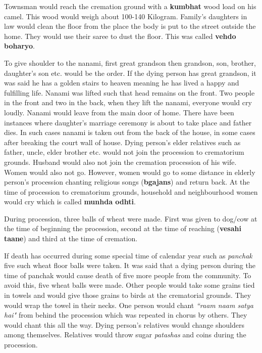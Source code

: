 Townsman would reach the cremation ground with a \textbf{kumbhat} wood load on
his camel. This wood would weigh about 100-140 Kilogram. Family's daughters in
law would clean the floor from the place the body is put to the street outside
the home. They would use their saree to dust the floor. This was called
\textbf{vehdo boharyo}.

To give shoulder to the nanami, first great grandson then grandson, son,
brother, daughter's son etc. would be the order. If the dying person has great
grandson, it was said he has a golden stairs to heaven meaning he has lived a
happy and fulfilling life. Nanami was lifted such that head remains on the
front. Two people in the front and two in the back, when they lift the nanami,
everyone would cry loudly. Nanami would leave from the main door of home. There
have been instances where daughter's marriage ceremony is about to take place
and father dies. In such cases nanami is taken out from the back of the house,
in some cases after breaking the court wall of house. Dying person's elder
relatives such as father, uncle, elder brother etc. would not join the
procession to crematorium grounds. Husband would also not join the cremation
procession of his wife. Women would also not go. However, women would go to
some distance in elderly person's procession chanting religious songs
(\textbf{bgajans}) and return back. At the time of procession to crematorium
grounds, household and neighbourhood women would cry which is called
\textbf{munhda odhti}. 

During procession, three balls of wheat were made. First was given to dog/cow
at the time of beginning the procession, second at the time of reaching
(\textbf{vesahi taane}) and third at the time of cremation.

If death has occurred during some special time of calendar year such as
\textit{panchak} five such wheat floor balls were taken. It was said that a
dying person during the time of panchak would cause death of five more people
from the community. To avoid this, five wheat balls were made. Other people
would take some grains tied in towels and would give those grains to birds at
the crematorial grounds. They would wrap the towel in their necks. One person
would chant \textit{``raam naam satya hai"} from behind the procession which was
repeated in chorus by others. They would chant this all the way. Dying person's
relatives would change shoulders among themselves. Relatives would throw sugar
\textit{patashas} and coins during the procession.

